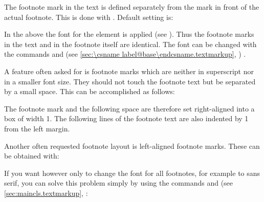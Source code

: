 %
The footnote mark in the text is defined separately from the mark in
front of the actual footnote. This is done with
. Default setting is:
\begin{lstcode}[belowskip=\dp\strutbox]
\end{lstcode}
In the above the font
for the element
 is
applied (see %
%
%
). %
Thus the footnote
marks in the text and in the footnote itself are identical. The font
can be changed with the commands  and
 (see \autoref{sec:\csname
  label@base\endcsname.textmarkup}, )%
.

\ifCommonscrlttr\else
\begin{Example}
  \label{desc:maincls.cmd.deffootnote.example}%
  A feature often asked for is footnote marks which are
  neither in superscript nor in a smaller font size. They should not touch the
  footnote text but be separated by a small space. This can be accomplished as
  follows:
\begin{lstcode}
\end{lstcode}
  The footnote mark and the following space are therefore set
  right-aligned into a box of width 1. The following lines of
  the footnote text are also indented by 1 from the left
  margin.
  
  Another often requested footnote layout is left-aligned
  footnote marks. These can be obtained with:
\begin{lstcode}
\end{lstcode}
  
  If you want however only to change the font for all footnotes, for example
  to sans serif, you can solve this problem simply by using the commands
   and  (see
  \autoref{sec:maincls.textmarkup},
  :
\begin{lstcode}
\end{lstcode}
\end{Example}%
%
\fi%
%
%
\EndIndexGroup
%
\EndIndexGroup


